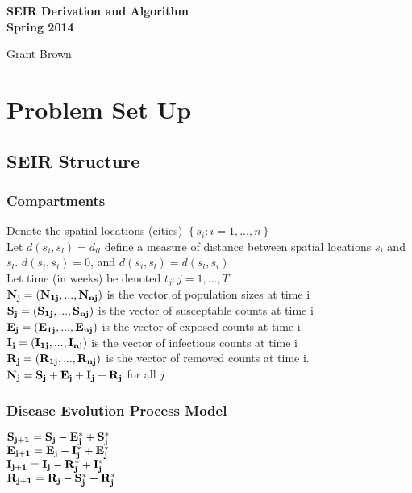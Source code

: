\documentclass[12pt]{article}
\newcommand \noi {\noindent}
\newcommand \mbreak {\\ \vspace{0.1in}}
\begin{document}
\begin{center}    
    \noi \bf SEIR Derivation and Algorithm\\
    \vspace{.05in}
    \noi Spring 2014\\
    \vspace{.05in}

    \vspace{.15in}
    \noi Grant Brown\\ 

\end{center}

\section{Problem Set Up}
\subsection{SEIR Structure}

    \subsubsection{Compartments}
        Denote the spatial locations (cities) $\left\{s_i : i = 1, ...,n \right\}$ \mbreak
        Let $d(s_i, s_l) = d_{il}$ define a measure of distance between 
        spatial locations $s_i$ and $s_l$. $d(s_i, s_i) = 0$, and $d(s_i, s_l) = d(s_l, s_i)$ \mbreak
        Let time (in weeks) be denoted ${t_j : j = 1, ...,T}$ \mbreak
        $\bf{N_j} = (N_{1j}, ..., N_{nj})$ is the vector of population sizes at time i \mbreak
        $\bf{S_j} = (S_{1j}, ..., S_{nj})$ is the vector of susceptable counts at time i \mbreak
        $\bf{E_j} = (E_{1j}, ..., E_{nj})$ is the vector of exposed counts at time i \mbreak
        $\bf{I_j} = (I_{1j}, ..., I_{nj})$ is the vector of infectious counts at time i \mbreak
        $\bf{R_j} = (R_{1j}, ..., R_{nj})$ is the vector of removed counts at time i. \mbreak
        $\bf{N_j} = \bf{S_j + E_j + I_j + R_j}$ for all $j$

    \subsubsection{Disease Evolution Process Model}
    \begin{center}
        $\bf{S_{j+1}} = \bf{S_j} - \bf{E_j^*} + \bf{S_j^*}$\mbreak
        $\bf{E_{j+1}} = \bf{E_j} - \bf{I_j^*} + \bf{E_j^*}$\mbreak
        $\bf{I_{j+1}} = \bf{I_j} - \bf{R_j^*} + \bf{I_j^*}$\mbreak
        $\bf{R_{j+1}} = \bf{R_j} - \bf{S_j^*} + \bf{R_j^*}$\mbreak
    \end{center}
    \vspace{0.15in}
\end{document}
